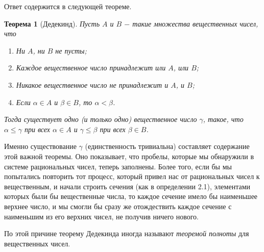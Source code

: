 \documentclass{article}
\newtheorem{theorem}{Теорема}[section]
\begin{document}
Ответ содержится в следующей теореме.

\begin{theorem}[Дедекинд]

Пусть \(A\) и \(B\) \(-\) такие множества вещественных чисел, что
\begin{enumerate}
    \item Ни \(A\), ни \(B\) не пусты;
    \item Каждое вещественное число принадлежит или \(A\), или \(B\);
    \item Никакое вещественное число не принадлежит и \(A\), и \(B\);
    \item Если \(\alpha \in A\) и \(\beta \in B\), то \(\alpha < \beta\).
\end{enumerate}

Тогда существует одно (и только одно) вещественное число \(\gamma\), такое, что \(\alpha \leq \gamma\) при всех \(\alpha \in A\) и \(\gamma \leq \beta\) при всех \(\beta \in B\).

\end{theorem}

Именно существование \(\gamma\) (единственность тривиальна) составляет содержание этой важной теоремы. Оно показывает, что пробелы, которые мы обнаружили в системе рациональных чисел, теперь заполнены. Более того, если бы мы попытались повторить тот процесс, который привел нас от рациональных чисел к вещественным, и начали строить сечения (как в определении 2.1), элементами которых были бы вещественные числа, то каждое сечение имело бы наименьшее верхнее число, и мы смогли бы сразу же отождествить каждое сечение с наименьшим из его верхних чисел, не получив ничего нового.

По этой причине теорему Дедекинда иногда называют \textit{теоремой полноты} для вещественных чисел.
\end{document}
